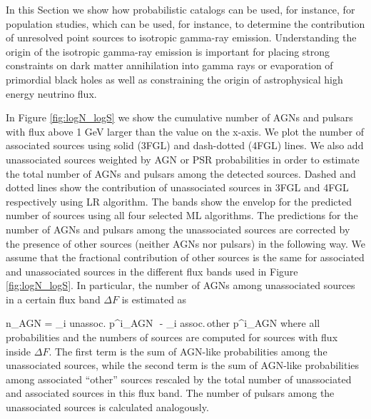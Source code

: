 In this Section we show how probabilistic catalogs can be used, for instance, for population studies,
which can be used, for instance, to determine the contribution of unresolved point sources to isotropic gamma-ray emission.
Understanding the origin of the isotropic gamma-ray emission is important for placing strong constraints
on dark matter annihilation into gamma rays or evaporation of primordial black holes
as well as constraining the origin of astrophysical high energy neutrino flux.

In Figure \ref{fig:logN_logS} we show the cumulative number of AGNs and pulsars with flux above 1 GeV larger than the
value on the x-axis.
We plot the number of associated sources using solid (3FGL) and dash-dotted (4FGL) lines.
We also add unassociated sources weighted by AGN or PSR probabilities in order to estimate the total number of AGNs and pulsars
among the detected sources.
Dashed and dotted lines show the contribution of unassociated sources in 3FGL and 4FGL respectively using LR algorithm.
The bands show the envelop for the predicted number of sources using all four selected ML algorithms.
The predictions for the number of AGNs and pulsars among the unassociated sources are corrected by the presence of other sources (neither AGNs nor pulsars) in the following way.
We assume that the fractional contribution of other sources is the same for associated and unassociated sources in the different flux bands used in Figure \ref{fig:logN_logS}.
In particular, the number of AGNs among unassociated sources in a certain flux band $\Delta F$ is estimated as

\be
n_{\rm AGN} = \sum_{i \in \rm unassoc.} p^i_{\rm AGN}\,\, - \sum_{i \in \rm assoc.\,other} p^i_{\rm AGN} \cdot {}
\ee
where all probabilities and the numbers of sources are computed for sources with flux inside $\Delta F$.
The first term is the sum of AGN-like probabilities among the unassociated sources,
while the second term is the sum of AGN-like probabilities among associated ``other'' sources rescaled by the total number
of unassociated and associated sources in this flux band.
The number of pulsars among the unassociated sources is calculated analogously.

